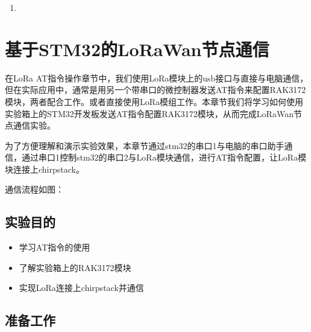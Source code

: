 \documentclass[a4paper,12pt,english]{sphinxmanual}
\begin{document}
{{\begin{enumerate}
\begin{quote}
\sphinxAtStartPar
注意：

\sphinxAtStartPar
如果将模式从LoRaWAN更改为LoRa P2P，设备将自动启动，反之亦然。
可能需要再次输入“ATE”命令，以确保P2P模式下的后续命令在终端上回显
\end{quote}

\item {} 
\end{enumerate}

\sphinxstepscope


\section{基于STM32的LoRaWan节点通信}
\label{\detokenize{exp-lora/lorawan-stm32:stm32lorawan}}\label{\detokenize{exp-lora/lorawan-stm32::doc}}
\sphinxAtStartPar
在LoRa AT指令操作章节中，我们使用LoRa模块上的usb接口与直接与电脑通信，但在实际应用中，通常是用另一个带串口的微控制器发送AT指令来配置RAK3172模块，两者配合工作。或者直接使用LoRa模组工作。本章节我们将学习如何使用实验箱上的STM32开发板发送AT指令配置RAK3172模块，从而完成LoRaWan节点通信实验。

\sphinxAtStartPar
为了方便理解和演示实验效果，本章节通过stm32的串口1与电脑的串口助手通信，通过串口1控制stm32的串口2与LoRa模块通信，进行AT指令配置，让LoRa模块连接上chirpstack。

\sphinxAtStartPar
通信流程如图：

\sphinxAtStartPar
{}


\subsection{实验目的}
\label{\detokenize{exp-lora/lorawan-stm32:id1}}\begin{itemize}
\item {} 
\sphinxAtStartPar
学习AT指令的使用

\item {} 
\sphinxAtStartPar
了解实验箱上的RAK3172模块

\item {} 
\sphinxAtStartPar
实现LoRa连接上chirpstack并通信

\end{itemize}


\subsection{准备工作}
\label{\detokenize{exp-lora/lorawan-stm32:id2}}

}}
\end{document}
